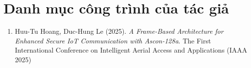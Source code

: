 \chapter*{Danh mục công trình của tác giả}
\label{Appendix1}

\begin{enumerate}
\item Huu-Tu Hoang, Duc-Hung Le (2025). \textit{A Frame-Based Architecture for Enhanced Secure IoT
Communication with Ascon-128a}. The First International Conference on Intelligent Aerial Access and
Applications (IAAA 2025)
\end{enumerate}